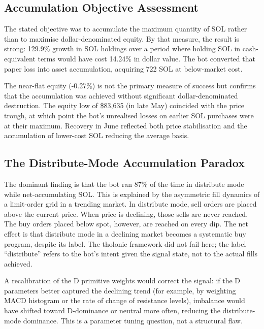 \documentclass[12pt]{article}
\begin{document}
\subsection{Accumulation Objective Assessment}\label{accumulation-objective-assessment}

The stated objective was to accumulate the maximum quantity of SOL
rather than to maximise dollar-denominated equity. By that measure, the
result is strong: 129.9\% growth in SOL holdings over a period where
holding SOL in cash-equivalent terms would have cost 14.24\% in dollar
value. The bot converted that paper loss into asset accumulation,
acquiring 722 SOL at below-market cost.

The near-flat equity (-0.27\%) is not the primary measure of success but
confirms that the accumulation was achieved without significant
dollar-denominated destruction. The equity low of \$83,635 (in late May)
coincided with the price trough, at which point the bot's unrealised
losses on earlier SOL purchases were at their maximum. Recovery in June
reflected both price stabilisation and the accumulation of lower-cost
SOL reducing the average basis.

\subsection{The Distribute-Mode Accumulation Paradox}\label{the-distribute-mode-accumulation-paradox}

The dominant finding is that the bot ran 87\% of the time in distribute
mode while net-accumulating SOL. This is explained by the asymmetric
fill dynamics of a limit-order grid in a trending market. In distribute
mode, sell orders are placed above the current price. When price is
declining, those sells are never reached. The buy orders placed below
spot, however, are reached on every dip. The net effect is that
distribute mode in a declining market becomes a systematic buy program,
despite its label. The tholonic framework did not fail here; the label
``distribute'' refers to the bot's intent given the signal state, not to
the actual fills achieved.

A recalibration of the D primitive weights would correct the signal: if
the D parameters better captured the declining trend (for example, by
weighting MACD histogram or the rate of change of resistance levels),
imbalance would have shifted toward D-dominance or neutral more often,
reducing the distribute-mode dominance. This is a parameter tuning
question, not a structural flaw.
\end{document}
